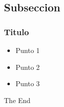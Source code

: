 \documentclass{beamer}
\begin{document}
\subsection{Subseccion} %

\begin{frame}
\frametitle{Titulo}
\begin{itemize}
\item Punto 1
\item Punto 2
\item Punto 3
\end{itemize}
\end{frame}


\begin{frame}
\Huge{\centerline{The End}}
\end{frame}

\end{document}

